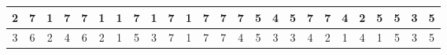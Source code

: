 \begin{sidewaystable}[]
\begin{tabular}{|c|c|c|c|c|c|c|c|c|c|c|c|c|c|c|c|c|c|c|c|c|c|c|c|c|}
    2       & 7                                               & 1                                               & 7                                               & 7                                               & 1                                               & 1                                               & 7                                               & 1                                               & 7                                               & 1                                                & 7                                                & 7                                                 &    7                                               & 5                                               & 4                                               & 5                                               & 7                                               & 7                                               & 4                                               & 2                                               & 5                                               & 5                                                & 3                                                & 5                                                \\ \hline
    3       & 6                                               & 2                                               & 4                                               & 6                                               & 2                                               & 1                                               & 5                                               & 3                                               & 7                                               & 1                                                & 7                                                & 7                                                 &    4                                               & 5                                               & 3                                               & 3                                               & 4                                               & 2                                               & 1                                               & 4                                               & 1                                               & 5                                                & 3                                                & 5                                                \\ \hline

\end{tabular}
\end{sidewaystable}
